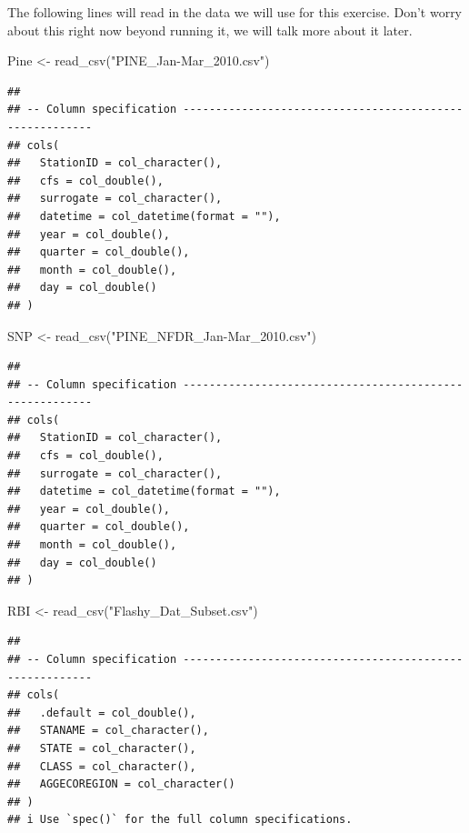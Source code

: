 \documentclass[
]{book}
\newenvironment{Shaded}{\begin{snugshade}}{\end{snugshade}}
\newcommand{\FunctionTok}[1]{\textcolor[rgb]{0.00,0.00,0.00}{#1}}
\newcommand{\NormalTok}[1]{#1}
\newcommand{\OtherTok}[1]{\textcolor[rgb]{0.56,0.35,0.01}{#1}}
\newcommand{\StringTok}[1]{\textcolor[rgb]{0.31,0.60,0.02}{#1}}
\begin{document}
The following lines will read in the data we will use for this exercise. Don't worry about this right now beyond running it, we will talk more about it later.

\begin{Shaded}
\begin{Highlighting}[]
\NormalTok{Pine }\OtherTok{\textless{}{-}} \FunctionTok{read\_csv}\NormalTok{(}\StringTok{"PINE\_Jan{-}Mar\_2010.csv"}\NormalTok{) }
\end{Highlighting}
\end{Shaded}

\begin{verbatim}
## 
## -- Column specification --------------------------------------------------------
## cols(
##   StationID = col_character(),
##   cfs = col_double(),
##   surrogate = col_character(),
##   datetime = col_datetime(format = ""),
##   year = col_double(),
##   quarter = col_double(),
##   month = col_double(),
##   day = col_double()
## )
\end{verbatim}

\begin{Shaded}
\begin{Highlighting}[]
\NormalTok{SNP }\OtherTok{\textless{}{-}} \FunctionTok{read\_csv}\NormalTok{(}\StringTok{"PINE\_NFDR\_Jan{-}Mar\_2010.csv"}\NormalTok{)}
\end{Highlighting}
\end{Shaded}

\begin{verbatim}
## 
## -- Column specification --------------------------------------------------------
## cols(
##   StationID = col_character(),
##   cfs = col_double(),
##   surrogate = col_character(),
##   datetime = col_datetime(format = ""),
##   year = col_double(),
##   quarter = col_double(),
##   month = col_double(),
##   day = col_double()
## )
\end{verbatim}

\begin{Shaded}
\begin{Highlighting}[]
\NormalTok{RBI }\OtherTok{\textless{}{-}} \FunctionTok{read\_csv}\NormalTok{(}\StringTok{"Flashy\_Dat\_Subset.csv"}\NormalTok{)}
\end{Highlighting}
\end{Shaded}

\begin{verbatim}
## 
## -- Column specification --------------------------------------------------------
## cols(
##   .default = col_double(),
##   STANAME = col_character(),
##   STATE = col_character(),
##   CLASS = col_character(),
##   AGGECOREGION = col_character()
## )
## i Use `spec()` for the full column specifications.
\end{verbatim}
\end{document}
